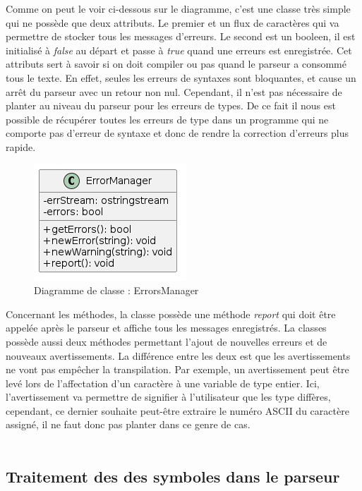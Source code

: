 \documentclass[a4paper]{article}%
\begin{document}
Comme on peut le voir ci-dessous sur le diagramme, c'est une classe très simple
qui ne possède que deux attributs. Le premier et un flux de caractères qui va
permettre de stocker tous les messages d'erreurs. Le second est un booleen, il
est initialisé à \textit{false} au départ et passe à \textit{true} quand une
erreurs est enregistrée. Cet attributs sert à savoir si on doit compiler ou pas
quand le parseur a consommé tous le texte. En effet, seules les erreurs de
syntaxes sont bloquantes, et cause un arrêt du parseur avec un retour non nul.
Cependant, il n'est pas nécessaire de planter au niveau du parseur pour les
erreurs de types. De ce fait il nous est possible de récupérer toutes les
erreurs de type dans un programme qui ne comporte pas d'erreur de syntaxe et
donc de rendre la correction d'erreurs plus rapide.

\begin{figure}[h!]
  \begin{center}
  \includegraphics[scale=0.5]{../ressources/diagrams/errMgr.png}
  \caption{Diagramme de classe : ErrorsManager}
  \end{center}
\end{figure}

Concernant les méthodes, la classe possède une méthode \textit{report} qui doit
être appelée après le parseur et affiche tous les messages enregistrés. La
classes possède aussi deux méthodes permettant l'ajout de nouvelles erreurs et
de nouveaux avertissements. La différence entre les deux est que les
avertissements ne vont pas empêcher la transpilation. Par exemple, un
avertissement peut être levé lors de l'affectation d'un caractère à une variable
de type entier. Ici, l'avertissement va permettre de signifier à l'utilisateur
que les type diffères, cependant, ce dernier souhaite peut-être extraire le
numéro ASCII du caractère assigné, il ne faut donc pas planter dans ce genre de
cas.\\~\\

\subsection{Traitement des des symboles dans le parseur}
\end{document}
